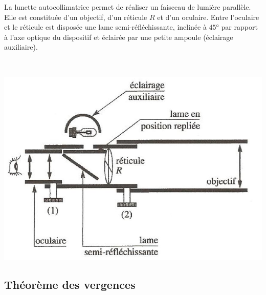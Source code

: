 \documentclass[../main/main.tex]{subfiles}
\begin{document}
\noindent
\begin{minipage}[c]{.4\linewidth}
	La lunette autocollimatrice permet de réaliser un faisceau de lumière
	parallèle. Elle est constituée d'un objectif, d'un réticule $R$ et d'un
	oculaire. Entre l'oculaire et le réticule est disposée une lame
	semi-réfléchissante, inclinée à $\ang{45;;}$ par rapport à l'axe optique du
	dispositif et éclairée par une petite ampoule (éclairage auxiliaire).
\end{minipage}
\hfill
\begin{minipage}[c]{.55\linewidth}
	~
	\begin{center}
		\includegraphics[width=\linewidth]{lunette_auto}
	\end{center}
\end{minipage}

\subsection{Théorème des vergences}

\end{document}

